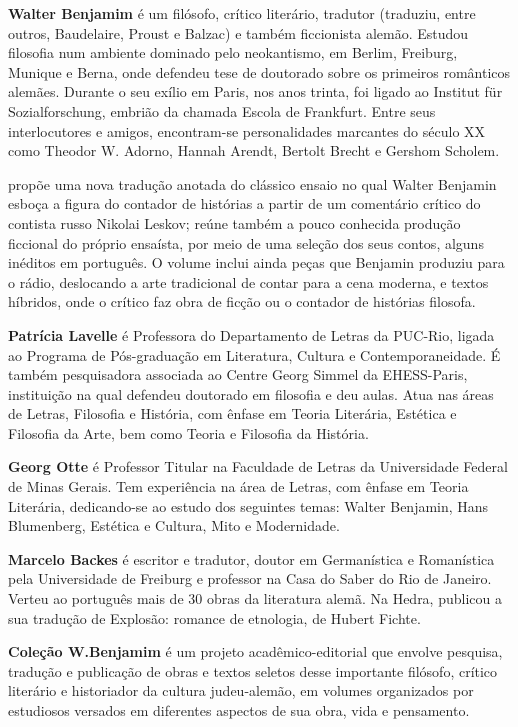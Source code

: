 
\textbf{Walter Benjamim} é um filósofo, crítico literário, tradutor (traduziu, entre outros, Baudelaire, Proust e Balzac) e também ficcionista alemão. Estudou filosofia num ambiente dominado pelo neokantismo, em Berlim, Freiburg, Munique e Berna, onde defendeu tese de doutorado sobre os primeiros românticos alemães. Durante o seu exílio em Paris, nos anos trinta, foi ligado ao Institut für Sozialforschung, embrião da chamada Escola de Frankfurt. Entre seus interlocutores e amigos, encontram-se personalidades marcantes do século XX como Theodor W. Adorno, Hannah Arendt, Bertolt Brecht e Gershom Scholem.

\textbf{\titulo} propõe uma nova tradução anotada do clássico ensaio no qual Walter Benjamin esboça a figura do contador de histórias a partir de um comentário crítico do contista russo Nikolai Leskov; reúne também a pouco conhecida produção ficcional do próprio ensaísta, por meio de uma seleção dos seus contos, alguns inéditos em português. O volume inclui ainda peças que Benjamin produziu para o rádio, deslocando a arte tradicional de contar para a cena moderna, e textos híbridos, onde o crítico faz obra de ficção ou o contador de histórias filosofa.

\textbf{Patrícia Lavelle} é Professora do Departamento de Letras da PUC-Rio, ligada ao Programa de Pós-graduação em Literatura, Cultura e Contemporaneidade. É também pesquisadora associada ao Centre Georg Simmel da EHESS-Paris, instituição na qual defendeu doutorado em filosofia e deu aulas. Atua nas áreas de Letras, Filosofia e História, com ênfase em Teoria Literária, Estética e Filosofia da Arte, bem como Teoria e Filosofia da História. 

\textbf{Georg Otte} é Professor Titular na Faculdade de Letras da Universidade Federal de Minas Gerais. Tem experiência na área de Letras, com ênfase em Teoria Literária, dedicando-se ao estudo dos seguintes temas: Walter Benjamin, Hans Blumenberg, Estética e Cultura, Mito e Modernidade.

\textbf{Marcelo Backes} é escritor e tradutor, doutor em Germanística e Romanística pela Universidade de Freiburg e professor na Casa do Saber do Rio de Janeiro. Verteu ao português mais de 30 obras da literatura alemã. Na Hedra, publicou a sua tradução de Explosão: romance de etnologia, de Hubert Fichte.

\textbf{Coleção W.Benjamim} é um projeto acadêmico-editorial que envolve pesquisa, tradução e publicação de obras e textos seletos desse importante filósofo, crítico literário e historiador da cultura judeu-alemão, em volumes organizados por estudiosos versados em diferentes aspectos de sua obra, vida e pensamento. 

